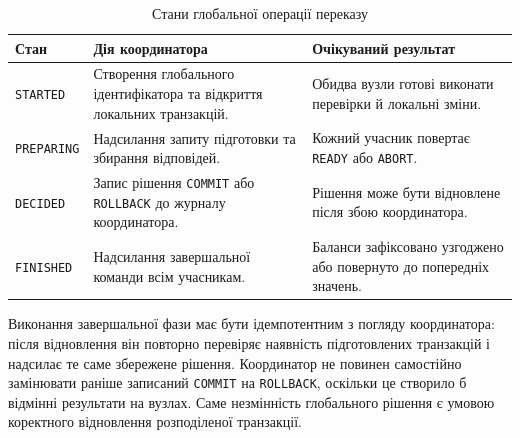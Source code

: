 \begin{table}[htbp]
\centering
\caption{Стани глобальної операції переказу}
\label{tab:transaction-states}
\fontsize{11pt}{13pt}\selectfont
\setlength{\tabcolsep}{4pt}
\renewcommand{\arraystretch}{1.16}
\begin{tabularx}{\textwidth}{|>{\RaggedRight\arraybackslash}p{}|
                               >{\RaggedRight\arraybackslash}p{}|
                               Y|}
\hline
\textbf{Стан} & \textbf{Дія координатора} & \textbf{Очікуваний результат} \\
\hline
\texttt{STARTED} & Створення глобального ідентифікатора та відкриття локальних транзакцій. & Обидва вузли готові виконати перевірки й локальні зміни. \\
\hline
\texttt{PREPARING} & Надсилання запиту підготовки та збирання відповідей. & Кожний учасник повертає \texttt{READY} або \texttt{ABORT}. \\
\hline
\texttt{DECIDED} & Запис рішення \texttt{COMMIT} або \texttt{ROLLBACK} до журналу координатора. & Рішення може бути відновлене після збою координатора. \\
\hline
\texttt{FINISHED} & Надсилання завершальної команди всім учасникам. & Баланси зафіксовано узгоджено або повернуто до попередніх значень. \\
\hline
\end{tabularx}
\end{table}

Виконання завершальної фази має бути ідемпотентним з погляду координатора: після відновлення він повторно перевіряє наявність підготовлених транзакцій і надсилає те саме збережене рішення. Координатор не повинен самостійно замінювати раніше записаний \texttt{COMMIT} на \texttt{ROLLBACK}, оскільки це створило б відмінні результати на вузлах. Саме незмінність глобального рішення є умовою коректного відновлення розподіленої транзакції.
